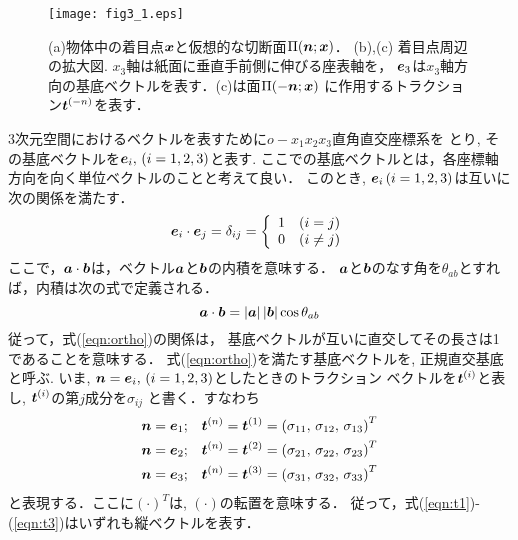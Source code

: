 \documentclass[10pt,a4j]{jbook}
\begin{document}
\begin{figure}[h]
	\begin{center}
	\texttt{[image: fig3\_1.eps]} 
	\end{center}
	\caption{(a)物体中の着目点$\mbox{\boldmath $x$}$と仮想的な切断面$\Pi(\mbox{\boldmath $n$};\mbox{\boldmath $x$})$．
	(b),(c) 着目点周辺の拡大図.
	$x_3$軸は紙面に垂直手前側に伸びる座表軸を，
	$\mbox{\boldmath $e$}_3$は$x_3$軸方向の基底ベクトルを表す．(c)は面$\Pi(-\mbox{\boldmath $n$};\mbox{\boldmath $x$})$
	に作用するトラクション$\mbox{\boldmath $t$}^{(-n)}$を表す．} 
	\label{fig:fig3_1}
\end{figure}
3次元空間におけるベクトルを表すために$o-x_1x_2x_3$直角直交座標系を
とり, その基底ベクトルを$\mbox{\boldmath $e$}_i,\, (i=1,2,3)$と表す.
ここでの基底ベクトルとは，各座標軸方向を向く単位ベクトルのことと考えて良い．
このとき, $\mbox{\boldmath $e$}_i\, (i=1,2,3)$は互いに次の関係を満たす．
\begin{equation}
	\mbox{\boldmath $e$}_i\cdot \mbox{\boldmath $e$}_j=
	\delta_{ij}=
	\left\{
	\begin{array}{cc}
		1 & (i=j) \\
		0 & (i \neq j) \\
	\end{array}
	\right.
	\label{eqn:ortho}
\end{equation}
ここで，$\mbox{\boldmath $a$} \cdot \mbox{\boldmath $b$}$は，ベクトル$\mbox{\boldmath $a$}$と$\mbox{\boldmath $b$}$の内積を意味する．
$\mbox{\boldmath $a$}$と$\mbox{\boldmath $b$}$のなす角を$\theta_{ab}$とすれば，内積は次の式で定義される．
\begin{equation}
	\mbox{\boldmath $a$}\cdot\mbox{\boldmath $b$}=
	\left|\mbox{\boldmath $a$}\right|
	\left|\mbox{\boldmath $b$}\right|
	\cos \theta_{ab}
\end{equation}
従って，式(\ref{eqn:ortho})の関係は， 基底ベクトルが互いに直交してその長さは1であることを意味する．
式(\ref{eqn:ortho})を満たす基底ベクトルを, 正規直交基底と呼ぶ.
いま, $\mbox{\boldmath $n$}=\mbox{\boldmath $e$}_i,\, (i=1,2,3)$としたときのトラクション
ベクトルを$\mbox{\boldmath $t$}^{(i)}$と表し, $\mbox{\boldmath $t$}^{(i)}$の第$j$成分を$\sigma_{ij}$
と書く．すなわち
\begin{eqnarray}
	\mbox{\boldmath $n$}=\mbox{\boldmath $e$}_1 &;& \mbox{\boldmath $t$}^{(n)}=\mbox{\boldmath $t$}^{(1)}
		=\left( \sigma_{11},\, \sigma_{12},\, \sigma_{13}\right)^T 
		\label{eqn:t1}
		\\
	\mbox{\boldmath $n$}=\mbox{\boldmath $e$}_2 &;& \mbox{\boldmath $t$}^{(n)}=\mbox{\boldmath $t$}^{(2)} 
		=\left( \sigma_{21},\, \sigma_{22},\, \sigma_{23}\right)^T 
		\label{eqn:t2}
		\\
	\mbox{\boldmath $n$}=\mbox{\boldmath $e$}_3 &;& \mbox{\boldmath $t$}^{(n)}=\mbox{\boldmath $t$}^{(3)} 
		=\left( \sigma_{31},\, \sigma_{32},\, \sigma_{33}\right)^T 
		\label{eqn:t3}
\end{eqnarray}
と表現する．ここに$(\cdot)^T$は, $(\cdot)$の転置を意味する．
従って，式(\ref{eqn:t1})-(\ref{eqn:t3})はいずれも縦ベクトルを表す．
\end{document}
